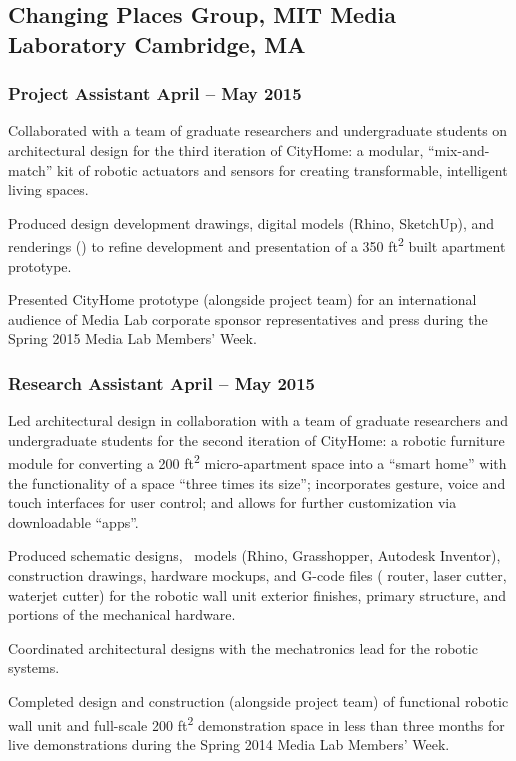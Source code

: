 \documentclass[letterpaper, oneside, 10pt]{article}
\begin{document}
\subsection*{Changing Places Group, MIT Media Laboratory\DotSep{0.25em} Cambridge, MA}

\subsubsection*{Project Assistant\DotSep{0.25em} April -- May 2015}

Collaborated with a team of graduate researchers and undergraduate
students on architectural design for the third iteration of CityHome: a
modular, ``mix-and-match'' kit of robotic actuators and sensors for
creating transformable, intelligent living spaces.

Produced design development drawings, digital models (Rhino, SketchUp),
and renderings (\kern-0.5pt) to refine development and
presentation of a 350 ft\textsuperscript{2} built apartment prototype.

Presented CityHome prototype (alongside project team) for an international
audience of Media Lab corporate sponsor representatives and press during
the Spring 2015  Media Lab Members’ Week.


\subsubsection*{Research Assistant\DotSep{0.25em} April -- May 2015}

Led architectural design in collaboration with a team of graduate
researchers and undergraduate students for the second iteration of
CityHome: a robotic furniture module for converting a 200
ft\textsuperscript{2} micro-apartment space into a ``smart home'' with the
functionality of a space ``three times its size''; incorporates gesture,
voice and touch interfaces for user control; and allows for further
customization via downloadable ``apps''.

Produced schematic designs, \ models (Rhino, Grasshopper, Autodesk
Inventor), construction drawings, hardware mockups, and G-code files
( router, laser cutter, waterjet cutter) for the robotic
wall unit exterior finishes, primary structure, and portions of the
mechanical hardware.

Coordinated architectural designs with the mechatronics lead for the
robotic systems.

Completed design and construction (alongside project team) of functional
robotic wall unit and full-scale 200 ft\textsuperscript{2} demonstration
space in less than three months for live demonstrations during the Spring
2014  Media Lab Members’ Week.
\end{document}
